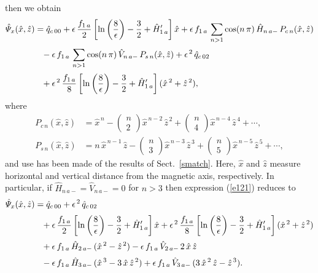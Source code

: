 \documentclass[12pt,prb,aps]{revtex4-1}
\begin{document}
 then we obtain
\begin{align}\label{e121}
\hat{\mit\Psi}_x(\hat{x},\hat{z})&= \hat{q}_{c\,00}+ \epsilon\,\frac{f_{1\,a}}{2}\left[\ln\left(\frac{8}{\epsilon}\right)-\frac{3}{2}+\hat{H}_{1\,a}'\right]\hat{x}
+\epsilon\,f_{1\,a}\,\sum_{n>1}\cos(n\,\pi)\,\hat{H}_{n\,a-}\,P_{c\,n}(\hat{x},\hat{z})\nonumber\\[0.5ex]
&\phantom{=}-\epsilon\,f_{1\,a}\,\sum_{n>1}\cos(n\,\pi)\,\hat{V}_{n\,a-}\,P_{s\,n}(\hat{x},\hat{z}) +\epsilon^{\,2}\,\hat{q}_{c\,02}\nonumber\\[0.5ex]
&\phantom{=}+\epsilon^{\,2}\,\frac{f_{1\,a}}{8}\left[\ln\left(\frac{8}{\epsilon}\right)-\frac{3}{2}+\hat{H}_{1\,a}'\right](\hat{x}^{\,2}+\hat{z}^{\,2}),
\end{align}
where\,\cite{grad}
\begin{align}
P_{c\,n}(\hat{x},\hat{z}) &= \hat{x}^{\,n}-\left(\begin{array}{c}n\\[-0.5ex]2\end{array}\right)\hat{x}^{\,n-2}\,\hat{z}^{\,2}+ \left(\begin{array}{c}n\\[-0.5ex]4\end{array}\right)\hat{x}^{\,n-4}\,\hat{z}^{\,4}+\cdots,\\[0.5ex]
P_{s\,n}(\hat{x},\hat{z}) &= n\,\hat{x}^{\,n-1}\,\hat{z}-\left(\begin{array}{c}n\\[-0.5ex]3\end{array}\right)\hat{x}^{\,n-3}\,\hat{z}^{\,3}+ \left(\begin{array}{c}n\\[-0.5ex]5\end{array}\right)\hat{x}^{\,n-5}\,\hat{z}^{\,5}+\cdots,
\end{align}
and use has been made of the results of Sect.~\ref{smatch}. Here, $\hat{x}$ and $\hat{z}$ measure horizontal and vertical distance from the magnetic axis, respectively. In particular, if $\hat{H}_{n\,a-}=\hat{V}_{n\,a-}=0$ for $n>3$ then
expression (\ref{e121}) reduces to
\begin{align}
\hat{\mit\Psi}_x(\hat{x},\hat{z})&= \hat{q}_{c\,00} +\epsilon^{\,2}\,\hat{q}_{c\,02}\nonumber\\[0.5ex]
&\phantom{=}+\epsilon\,\frac{f_{1\,a}}{2}\left[\ln\left(\frac{8}{\epsilon}\right)-\frac{3}{2}+\hat{H}_{1\,a}'\right]\hat{x}+\epsilon^{\,2}\,\frac{f_{1\,a}}{8}\left[\ln\left(\frac{8}{\epsilon}\right)-\frac{3}{2}+\hat{H}_{1\,a}'\right](\hat{x}^{\,2}+\hat{z}^{\,2})
\nonumber\\[0.5ex]
&\phantom{=}+ \epsilon\,f_{1\,a}\,\hat{H}_{2\,a-}\,(\hat{x}^{\,2}-\hat{z}^{\,2})-\epsilon\,f_{1\,a}\,\hat{V}_{2\,a-}\,2\,\hat{x}\,\hat{z}
\nonumber\\[0.5ex]&\phantom{=}- \epsilon\,f_{1\,a}\,\hat{H}_{3\,a-}\,(\hat{x}^{\,3}-3\,\hat{x}\,\hat{z}^{\,2})
+ \epsilon\,f_{1\,a}\,\hat{V}_{3\,a-}\,(3\,\hat{x}^{\,2}\,\hat{z}- \hat{z}^{\,3}).
\end{align}
\end{document}
